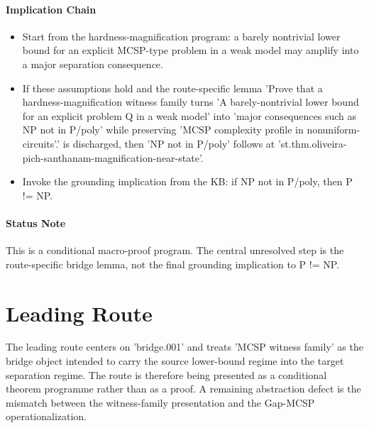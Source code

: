 \documentclass[11pt]{article}
\begin{document}
\paragraph{Implication Chain}
\begin{itemize}[leftmargin=*,itemsep=0.2em]
\item Start from the hardness-magnification program: a barely nontrivial lower bound for an explicit MCSP-type problem in a weak model may amplify into a major separation consequence.
\item If these assumptions hold and the route-specific lemma 'Prove that a hardness-magnification witness family turns 'A barely-nontrivial lower bound for an explicit problem Q in a weak model' into 'major consequences such as NP not in P/poly' while preserving 'MCSP complexity profile in nonuniform-circuits'.' is discharged, then 'NP not in P/poly' follows at 'st.thm.oliveira-pich-santhanam-magnification-near-state'.
\item Invoke the grounding implication from the KB: if NP not in P/poly, then P != NP.
\end{itemize}

\paragraph{Status Note}
This is a conditional macro-proof program. The central unresolved step is the route-specific bridge lemma, not the final grounding implication to P != NP.

\section{Leading Route}
The leading route centers on 'bridge.001' and treats 'MCSP witness family' as the bridge object intended to carry the source lower-bound regime into the target separation regime. The route is therefore being presented as a conditional theorem programme rather than as a proof. A remaining abstraction defect is the mismatch between the witness-family presentation and the Gap-MCSP operationalization.
\end{document}
